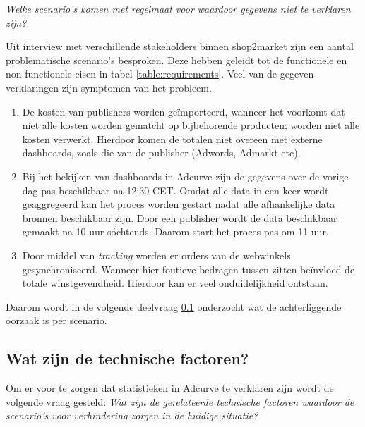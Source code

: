 \textit{Welke scenario's komen met regelmaat voor waardoor gegevens niet te verklaren zijn?}


Uit interview met verschillende stakeholders binnen shop2market zijn een aantal problematische scenario's besproken. Deze hebben geleidt tot de functionele en non functionele eisen in tabel \ref{table:requirements}. Veel van de gegeven verklaringen zijn symptomen van het probleem.


\begin{enumerate}
    \item De kosten van publishers worden geïmporteerd, wanneer het voorkomt dat niet alle kosten worden gematcht op bijbehorende producten; worden niet alle kosten verwerkt. Hierdoor komen de totalen niet overeen met externe dashboards, zoals die van de publisher (Adwords, Admarkt etc). \\
    
    \item Bij het bekijken van dashboards in Adcurve zijn de gegevens over de vorige dag pas beschikbaar na 12:30 CET. Omdat alle data in een keer wordt geaggregeerd kan het proces worden gestart nadat alle afhankelijke data bronnen beschikbaar zijn. Door een publisher wordt de data beschikbaar gemaakt na 10 uur s\'ochtends. Daarom start het proces pas om 11 uur. \\
    
    \item Door middel van \textit{tracking} worden er orders van de webwinkels gesynchroniseerd. Wanneer hier foutieve bedragen tussen zitten beïnvloed de totale winstgevendheid. Hierdoor kan er veel onduidelijkheid ontstaan. \\
\end{enumerate}

Daarom wordt in de volgende deelvraag \ref{subsec:deelvraag3a} onderzocht wat de achterliggende oorzaak is per scenario.

\clearpage

\subsection{Wat zijn de technische factoren?}
\label{subsec:deelvraag3a}

Om er voor te zorgen dat statistieken in Adcurve te verklaren zijn wordt de volgende vraag gesteld:
\textit{Wat zijn de gerelateerde technische factoren waardoor de scenario's voor verhindering zorgen in de huidige situatie?} \\

